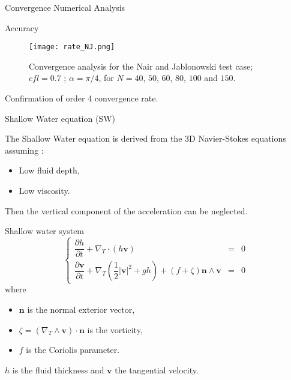 \documentclass[11pt]{beamer}
\begin{document}
\begin{frame}{Convergence Numerical Analysis}
\begin{block}{Accuracy}
\begin{figure}
\texttt{[image: rate\_NJ.png]}
\caption{Convergence analysis for the Nair and Jablonowski test case; $cfl = 0.7$ ; $\alpha = \pi /4$, for $N=40$, $50$, $60$, $80$, $100$ and $150$.}
\end{figure}
\end{block}

\begin{block}{}
Confirmation of order 4 convergence rate.
\end{block}

\end{frame}


\begin{frame}{Shallow Water equation (SW)}

The Shallow Water equation is derived from the 3D Navier-Stokes equations assuming :
\begin{itemize}
\item Low fluid depth,
\item Low viscosity.
\end{itemize}
Then the vertical component of the acceleration can be neglected.

\begin{block}{Shallow water system }
\begin{equation}
\left\lbrace
\begin{array}{rcl}
\dfrac{\partial h}{\partial t} + \nabla_T \cdot \left( h \mathbf{v} \right) & = & 0 \\
\dfrac{\partial \mathbf{v}}{\partial t} + \nabla_T \left( \dfrac{1}{2}|\mathbf{v}|^2 + gh \right) + \left( f + \zeta \right) \mathbf{n} \wedge \mathbf{v} & = & 0
\end{array}
\right.
\end{equation}
where 
\begin{itemize}
\item $\mathbf{n}$ is the normal exterior vector, 
\item $\zeta = \left( \nabla_T \wedge \mathbf{v} \right) \cdot \mathbf{n}$ is the vorticity,
\item $f$ is the Coriolis parameter.
\end{itemize}

$h$ is the fluid thickness and $\mathbf{v}$ the tangential velocity.
\end{block}
\end{frame}
\end{document}
